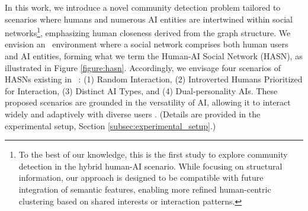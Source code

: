 In this work, we introduce a novel community detection problem tailored to scenarios where humans and numerous AI entities are intertwined within social networks\footnote{To the best of our knowledge, this is the first study to explore community detection in the hybrid human-AI scenario. While focusing on structural information, our approach is designed to be compatible with future integration of semantic features, enabling more refined human-centric clustering based on shared interests or interaction patterns.}, emphasizing human closeness derived from the graph structure. We envision an \XR\ environment where a social network comprises both human users and AI entities, forming what we term the Human-AI Social Network (HASN), as illustrated in Figure \ref{figure:hasn}. Accordingly, we envisage four scenarios of HASNs existing in \XR\ \cite{techcrunch_meta_2024}: (1) Random Interaction, (2) Introverted Humans Prioritized for Interaction, (3) Distinct AI Types, and (4) Dual-personality AIs. These proposed scenarios are grounded in the versatility of AI, allowing it to interact widely and adaptively with diverse users \cite{wang2024survey}. (Details are provided in the experimental setup, Section \ref{subsec:experimental_setup}.)



